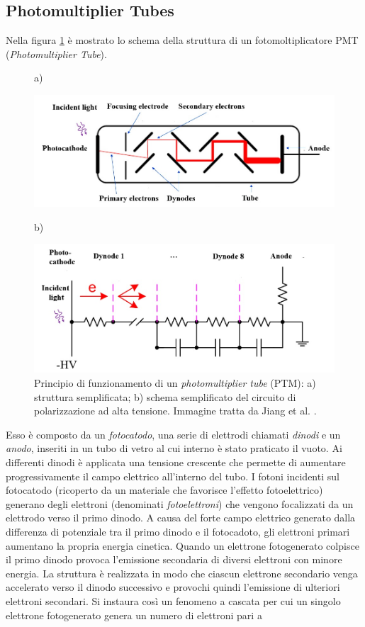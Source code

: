 \subsection{Photomultiplier Tubes}
Nella figura \ref{fig:ptm} è mostrato lo schema della struttura di un fotomoltiplicatore PMT (\textit{Photomultiplier Tube}).
\begin{figure}[tbh]
	\centering
	a)
	\begin{minipage}{.70\textwidth}
		\includegraphics[width=\linewidth]{./ImageFiles/ptm.jpg}
	\end{minipage}

	b)
	\begin{minipage}{.70\textwidth}
		\includegraphics[width=\linewidth]{./ImageFiles/ptm_schema.jpg}
	\end{minipage}
	\caption{Principio di funzionamento di un \textit{photomultiplier tube} (PTM): a) struttura semplificata; b) schema semplificato del circuito di polarizzazione ad alta tensione. Immagine tratta da Jiang et al. \cite{Jiang2019}.}
	\label{fig:ptm}
\end{figure}
Esso è composto da un \textit{fotocatodo}, una serie di elettrodi chiamati \textit{dinodi} e un \textit{anodo}, inseriti in un tubo di vetro al cui interno è stato praticato il vuoto. Ai differenti dinodi è applicata una tensione crescente che permette di aumentare progressivamente il campo elettrico all'interno del tubo. I fotoni incidenti sul fotocatodo (ricoperto da un materiale che favorisce l'effetto fotoelettrico) generano degli elettroni (denominati \textit{fotoelettroni}) che vengono focalizzati da un elettrodo verso il primo dinodo. A causa del forte campo elettrico generato dalla differenza di potenziale tra il primo dinodo e il fotocadoto, gli elettroni primari aumentano la propria energia cinetica. Quando un elettrone fotogenerato colpisce il primo dinodo provoca l'emissione secondaria di diversi elettroni con minore energia. La struttura è realizzata in modo che ciascun elettrone secondario venga accelerato verso il dinodo successivo e provochi quindi l'emissione di ulteriori elettroni secondari. Si instaura così un fenomeno a cascata per cui un singolo elettrone fotogenerato genera un numero di elettroni pari a 
